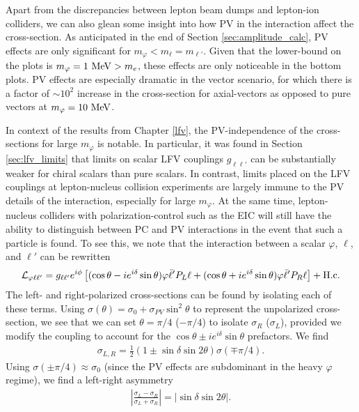 Apart from the discrepancies between lepton beam dumps and lepton-ion colliders, we can also glean some insight into how PV in the interaction affect the cross-section. As anticipated in the end of Section \ref{sec:amplitude_calc}, PV effects are only significant for $m_\varphi < m_\ell = m_{\ell'}$. Given that the lower-bound on the plots is $m_\varphi = 1~{\rm MeV} > m_e$, these effects are only noticeable in the bottom plots. PV effects are especially dramatic in the vector scenario, for which there is a factor of $\sim 10^2$ increase in the cross-section for axial-vectors as opposed to pure vectors at $m_\varphi = 10~{\rm MeV}$.

In context of the results from Chapter \ref{lfv}, the PV-independence of the cross-sections for large $m_\varphi$ is notable. In particular, it was found in Section \ref{sec:lfv_limits} that limits on scalar LFV couplings $g_{\ell\ell'}$ can be substantially weaker for chiral scalars than pure scalars. In contrast, limits placed on the LFV couplings at lepton-nucleus collision experiments are largely immune to the PV details of the interaction, especially for large $m_\varphi$. At the same time, lepton-nucleus colliders with polarization-control such as the EIC will still have the ability to distinguish between PC and PV interactions in the event that such a particle is found. To see this, we note that the interaction between a scalar $\varphi$, $\ell$, and $\ell'$ can be rewritten
\begin{align}
    {\cal L}_{\varphi \ell \ell'} = g_{\ell \ell'}e^{i\phi} \left[(\cos{\theta} - ie^{i\delta} \sin{\theta})\varphi\bar{\ell}'P_L\ell + (\cos{\theta} + ie^{i\delta} \sin{\theta})\varphi\bar{\ell}'P_R\ell\right] + {\rm H.c.}
\end{align}
The left- and right-polarized cross-sections can be found by isolating each of these terms. Using $\sigma(\theta) = \sigma_0 + \sigma_{PV}\sin^2{\theta}$ to represent the unpolarized cross-section, we see that we can set $\theta = \pi/4$ ($-\pi/4$) to isolate $\sigma_R$ ($\sigma_L$), provided we modify the coupling to account for the $\cos{\theta}\pm ie^{i\delta}\sin{\theta}$ prefactors. We find
\begin{align}
    \sigma_{L,R} = \frac{1}{2}(1 \pm \sin{\delta}\sin{2\theta})\sigma(\mp \pi/4).
\end{align}
Using $\sigma(\pm \pi/4) \approx \sigma_0$ (since the PV effects are subdominant in the heavy $\varphi$ regime), we find a left-right asymmetry
\begin{align}
    \left|\frac{\sigma_L - \sigma_R}{\sigma_L + \sigma_R}\right| = \left|\sin{\delta}\sin{2\theta}\right|.
\end{align}
